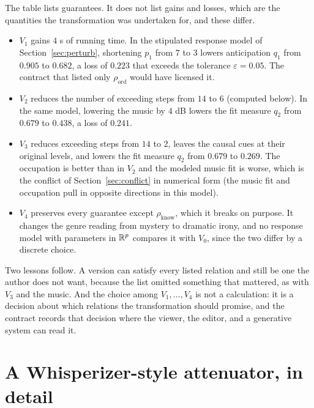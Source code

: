 The table lists guarantees. It does not list gains and losses, which are the quantities the transformation was undertaken for, and these differ.

\begin{itemize}
\item $V_1$ gains $4$ s of running time. In the stipulated response model of Section~\ref{sec:perturb}, shortening $p_1$ from $7$ to $3$ lowers anticipation $q_1$ from $0.905$ to $0.682$, a loss of $0.223$ that exceeds the tolerance $\varepsilon=0.05$. The contract that listed only $\rho_{\mathrm{ord}}$ would have licensed it.
\item $V_2$ reduces the number of exceeding steps from $14$ to $6$ (computed below). In the same model, lowering the music by $4$ dB lowers the fit measure $q_2$ from $0.679$ to $0.438$, a loss of $0.241$.
\item $V_3$ reduces exceeding steps from $14$ to $2$, leaves the causal cues at their original levels, and lowers the fit measure $q_2$ from $0.679$ to $0.269$. The occupation is better than in $V_2$ and the modeled music fit is worse, which is the conflict of Section~\ref{sec:conflict} in numerical form (the music fit and occupation pull in opposite directions in this model).
\item $V_4$ preserves every guarantee except $\rho_{\mathrm{know}}$, which it breaks on purpose. It changes the genre reading from mystery to dramatic irony, and no response model with parameters in $\mathbb{R}^p$ compares it with $V_0$, since the two differ by a discrete choice.
\end{itemize}

Two lessons follow. A version can satisfy every listed relation and still be one the author does not want, because the list omitted something that mattered, as with $V_3$ and the music. And the choice among $V_1,\dots,V_4$ is not a calculation: it is a decision about which relations the transformation should promise, and the contract records that decision where the viewer, the editor, and a generative system can read it.

\section{A Whisperizer-style attenuator, in detail}\label{sec:whisper}


